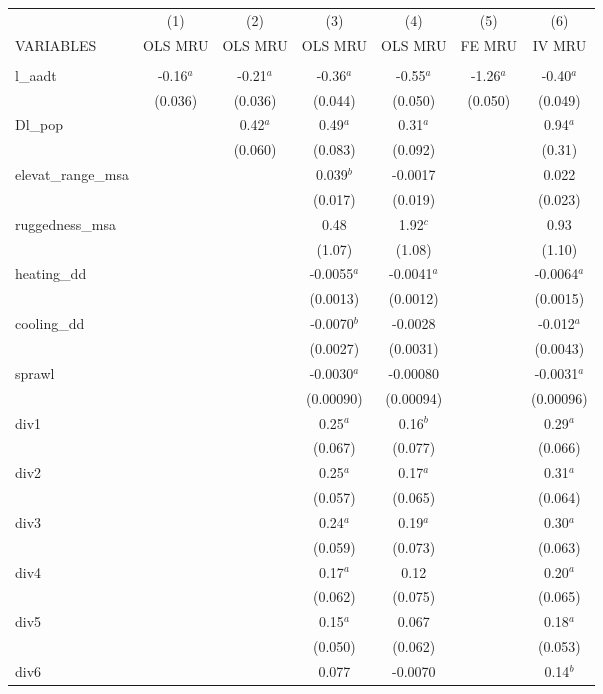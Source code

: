 \documentclass[]{article}
\begin{document}
\begin{tabular}{lcccccc} \hline
 & (1) & (2) & (3) & (4) & (5) & (6) \\
VARIABLES & OLS MRU & OLS MRU & OLS MRU & OLS MRU & FE MRU & IV MRU \\ \hline
 &  &  &  &  &  &  \\
l\_aadt & -0.16$^a$ & -0.21$^a$ & -0.36$^a$ & -0.55$^a$ & -1.26$^a$ & -0.40$^a$ \\
 & (0.036) & (0.036) & (0.044) & (0.050) & (0.050) & (0.049) \\
Dl\_pop &  & 0.42$^a$ & 0.49$^a$ & 0.31$^a$ &  & 0.94$^a$ \\
 &  & (0.060) & (0.083) & (0.092) &  & (0.31) \\
elevat\_range\_msa &  &  & 0.039$^b$ & -0.0017 &  & 0.022 \\
 &  &  & (0.017) & (0.019) &  & (0.023) \\
ruggedness\_msa &  &  & 0.48 & 1.92$^c$ &  & 0.93 \\
 &  &  & (1.07) & (1.08) &  & (1.10) \\
heating\_dd &  &  & -0.0055$^a$ & -0.0041$^a$ &  & -0.0064$^a$ \\
 &  &  & (0.0013) & (0.0012) &  & (0.0015) \\
cooling\_dd &  &  & -0.0070$^b$ & -0.0028 &  & -0.012$^a$ \\
 &  &  & (0.0027) & (0.0031) &  & (0.0043) \\
sprawl &  &  & -0.0030$^a$ & -0.00080 &  & -0.0031$^a$ \\
 &  &  & (0.00090) & (0.00094) &  & (0.00096) \\
div1 &  &  & 0.25$^a$ & 0.16$^b$ &  & 0.29$^a$ \\
 &  &  & (0.067) & (0.077) &  & (0.066) \\
div2 &  &  & 0.25$^a$ & 0.17$^a$ &  & 0.31$^a$ \\
 &  &  & (0.057) & (0.065) &  & (0.064) \\
div3 &  &  & 0.24$^a$ & 0.19$^a$ &  & 0.30$^a$ \\
 &  &  & (0.059) & (0.073) &  & (0.063) \\
div4 &  &  & 0.17$^a$ & 0.12 &  & 0.20$^a$ \\
 &  &  & (0.062) & (0.075) &  & (0.065) \\
div5 &  &  & 0.15$^a$ & 0.067 &  & 0.18$^a$ \\
 &  &  & (0.050) & (0.062) &  & (0.053) \\
div6 &  &  & 0.077 & -0.0070 &  & 0.14$^b$ \\

\end{tabular}
\end{document}
